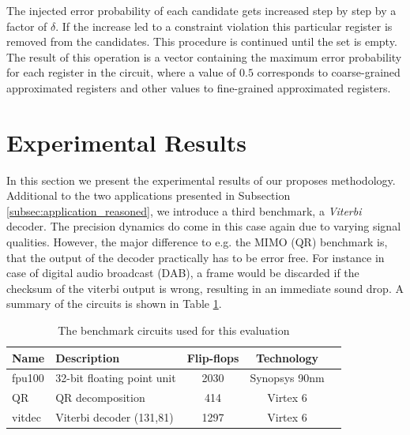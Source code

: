 \documentclass[conference]{IEEEtran}
\begin{document}
The injected error probability of each candidate gets increased step by step by a factor of $\delta$. If the increase led to a constraint violation this particular register is removed from the candidates. This procedure is continued until the set is empty. The result of this operation is a vector containing the maximum error probability for each register in the circuit, where a value of $0.5$ corresponds to coarse-grained approximated registers and other values to fine-grained approximated registers.
\section{Experimental Results}
\label{sec:experimental_results}
In this section we present the experimental results of our proposes methodology. Additional to the two applications presented in Subsection \ref{subsec:application_reasoned}, we introduce a third benchmark, a \emph{Viterbi} decoder. The precision dynamics do come in this case again due to varying signal qualities. However, the major difference to e.g. the MIMO (QR) benchmark is, that the output of the decoder practically has to be error free. For instance in case of digital audio broadcast (DAB), a frame would be discarded if the checksum of the viterbi output is wrong, resulting in an immediate sound drop. A summary of the circuits is shown in Table \ref{tab:benchmark_circuits}.
\begin{table}[htb]
\caption{The benchmark circuits used for this evaluation}
\label{tab:benchmark_circuits}
\centering
\begin{tabular} {| l | l | c | c | c |}
\hline
Name & Description  & Flip-flops & Technology\\
\hline\hline
fpu100 \cite{al2007fpu100} & 32-bit floating point unit  & 2030 & Synopsys 90nm\\
QR \cite{gimmler-dumont_asic_2013} & QR decomposition  & 414 & Virtex 6\\
vitdec \cite{fehrenz2014viterbi} & Viterbi decoder (131,81)  & 1297 & Virtex 6\\
\hline
\end{tabular}
\end{table}
\end{document}
